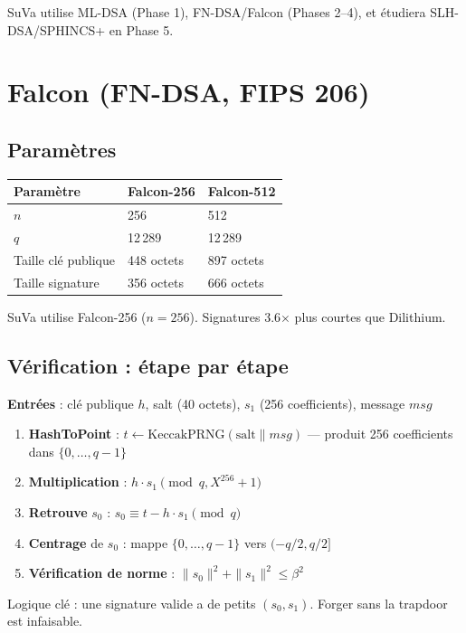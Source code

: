 \documentclass[11pt,a4paper]{article}
\begin{document}
SuVa utilise ML-DSA (Phase 1), FN-DSA/Falcon (Phases 2--4), et étudiera SLH-DSA/SPHINCS+ en Phase 5.

\section{Falcon (FN-DSA, FIPS 206)}

\subsection{Paramètres}

\begin{center}
\begin{tabular}{lll}
\toprule
\textbf{Paramètre} & \textbf{Falcon-256} & \textbf{Falcon-512} \\
\midrule
$n$ & 256 & 512 \\
$q$ & 12\,289 & 12\,289 \\
Taille clé publique & 448 octets & 897 octets \\
Taille signature    & 356 octets & 666 octets \\
\bottomrule
\end{tabular}
\end{center}

SuVa utilise Falcon-256 ($n=256$). Signatures 3.6$\times$ plus courtes que Dilithium.

\subsection{Vérification : étape par étape}

\begin{infobox}
\textbf{Entrées} : clé publique $h$, salt (40 octets), $s_1$ (256 coefficients), message $msg$

\begin{enumerate}
  \item \textbf{HashToPoint} : $t \gets \text{KeccakPRNG}(\text{salt} \| msg)$ --- produit 256 coefficients dans $\{0,\ldots,q-1\}$
  \item \textbf{Multiplication} : $h \cdot s_1 \pmod{q, X^{256}+1}$
  \item \textbf{Retrouve} $s_0$ : $s_0 \equiv t - h \cdot s_1 \pmod{q}$
  \item \textbf{Centrage} de $s_0$ : mappe $\{0,\ldots,q-1\}$ vers $(-q/2, q/2]$
  \item \textbf{Vérification de norme} : $\|s_0\|^2 + \|s_1\|^2 \leq \beta^2$
\end{enumerate}

Logique clé : une signature valide a de petits $(s_0, s_1)$. Forger sans la trapdoor est infaisable.
\end{infobox}
\end{document}

